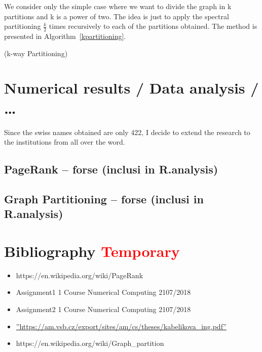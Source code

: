 \documentclass[]{usiinfbachelorproject}
\makeatletter
\def\BState{\State\hskip-\ALG@thistlm}
\makeatother
\begin{document}
We consider only the simple case where we want to divide the graph in k partitions and k is a power of two. The idea is just to apply the spectral partitioning $\frac{k}{2}$ times recursively to each of the partitions obtained. The method is presented in Algorithm~\ref{kpartitioning}.

\begin{algorithm}
\caption{ (k-way Partitioning)}\label{kpartitioning}
\end{algorithm}


\section{Numerical results / Data analysis / \ldots}
Since the swiss names obtained are only 422, I decide to extend the research to the institutions from all over the word.
\subsection{PageRank -- forse (inclusi in R.analysis)}

\subsection{Graph Partitioning -- forse (inclusi in R.analysis)}

\newpage

\section{Bibliography  \textcolor{red}{Temporary}}
\begin{itemize}
\item https://en.wikipedia.org/wiki/PageRank
\item Assignment1 1 Course Numerical Computing 2107/2018
\item Assignment2 1 Course Numerical Computing 2107/2018
\item \hyperref[label_name]{''https://am.vsb.cz/export/sites/am/cs/theses/kabelikova\_ing.pdf''}
\item https://en.wikipedia.org/wiki/Graph\_partition
\end{itemize}
\end{document}

